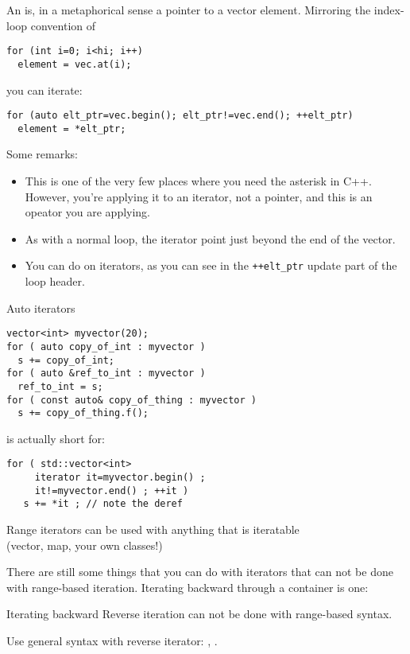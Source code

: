An  is, in a metaphorical sense
a pointer to a vector element.
Mirroring the index-loop convention of
\begin{lstlisting}
for (int i=0; i<hi; i++)
  element = vec.at(i);
\end{lstlisting}
you can iterate:
\begin{lstlisting}
for (auto elt_ptr=vec.begin(); elt_ptr!=vec.end(); ++elt_ptr)
  element = *elt_ptr;
\end{lstlisting}
Some remarks:
\begin{itemize}
\item This is one of the very few places where you need the asterisk in C++.
  However, you're applying it to an iterator, not a pointer,
  and this is an opeator you are applying.
\item As with a normal loop, the  iterator point just beyond the end
  of the vector.
\item You can do  on iterators, as
  you can see in the \lstinline|++elt_ptr| update part of the loop header.
\end{itemize}

\begin{block}{Auto iterators}
  \label{sl:auto-iterator}
  \begin{multicols}{2}
\begin{lstlisting}
vector<int> myvector(20);
for ( auto copy_of_int : myvector )
  s += copy_of_int;
for ( auto &ref_to_int : myvector )
  ref_to_int = s;
for ( const auto& copy_of_thing : myvector )
  s += copy_of_thing.f();
\end{lstlisting}
    is actually short for:
\begin{lstlisting}
for ( std::vector<int>
     iterator it=myvector.begin() ;
     it!=myvector.end() ; ++it )
   s += *it ; // note the deref
\end{lstlisting}
  \end{multicols}
  Range iterators can be used with anything that is iteratable\\
  (vector, map, your own classes!)
\end{block}

There are still some things that you can do with iterators that
can not be done with range-based iteration.
Iterating backward through a container is one:

\begin{block}{Iterating backward}
  \label{sl:reverse-iterator}
  Reverse iteration can not be done with range-based syntax.
  
  Use general syntax with reverse iterator: ,
  .
\end{block}

